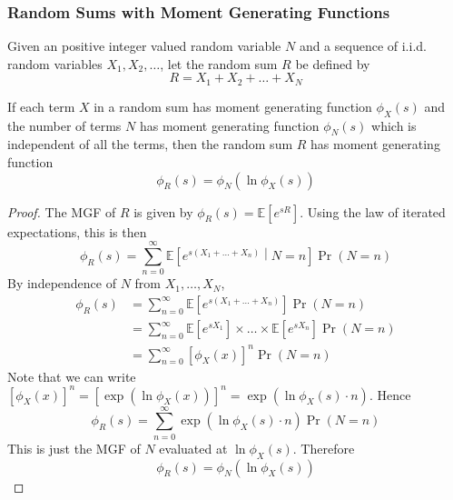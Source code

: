\documentclass[11pt]{report} %
\begin{document}
\subsubsection{Random Sums with Moment Generating Functions}

Given an positive integer valued random variable $N$ and a sequence of i.i.d. random variables $X_{1}, X_{2}, \dots$, let the random sum $R$ be defined by
\begin{equation}
R = X_{1} +  X_{2} + \dots + X_{N}
\end{equation}
\begin{theorem}
If each term $X$ in a random sum has moment generating function $\phi_{X}\left(s\right)$ and the number of terms $N$ has moment generating function $\phi_{N}\left(s\right)$ which is independent of all the terms, then the random sum $R$ has moment generating function
\begin{equation}
\phi_{R}\left(s\right) = \phi_{N}\left(\ln \phi_{X}\left(s\right) \right)
\end{equation}
\end{theorem}
\begin{proof}
The MGF of $R$ is given by $\phi_{R}\left(s\right) = \mathbb{E}\left[e^{sR}\right]$. Using the law of iterated expectations, this is then
\begin{equation}
\phi_{R}\left(s\right) = \sum_{n = 0}^{\infty}\mathbb{E}\left[e^{s\left(X_{1} + \dots + X_{n}\right)}\middle|N = n\right]\operatorname{Pr}\left(N = n\right)
\end{equation}
By independence of $N$ from $X_{1}, \dots, X_{N}$, 
\begin{align}
\phi_{R}\left(s\right) &= \sum_{n = 0}^{\infty}\mathbb{E}\left[e^{s\left(X_{1} + \dots + X_{n}\right)}\right]\operatorname{Pr}\left(N = n\right) \\
&= \sum_{n = 0}^{\infty}\mathbb{E}\left[e^{sX_{1}}\right]\times\dots\times\mathbb{E}\left[e^{sX_{n}}\right]\operatorname{Pr}\left(N = n\right) \\
&= \sum_{n = 0}^{\infty}\left[\phi_{X}\left(x\right)\right]^{n}\operatorname{Pr}\left(N = n\right)
\end{align}
Note that we can write $\left[\phi_{X}\left(x\right)\right]^{n} = \left[\exp\left(\ln\phi_{X}\left(x\right)\right)\right]^{n} = \exp\left(\ln\phi_{X}\left(s\right)\cdot n\right)$. Hence
\begin{equation}
\phi_{R}\left(s\right) = \sum_{n = 0}^{\infty}\exp\left(\ln\phi_{X}\left(s\right)\cdot n\right)\operatorname{Pr}\left(N = n\right)
\end{equation}
This is just the MGF of $N$ evaluated at $\ln\phi_{X}\left(s\right)$. Therefore
\begin{equation}
\phi_{R}\left(s\right) = \phi_{N}\left(\ln \phi_{X}\left(s\right) \right)
\end{equation}
\end{proof}
\end{document}
